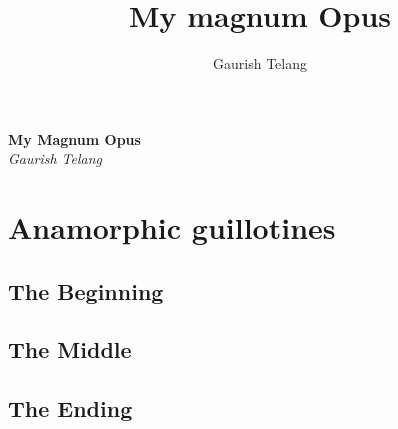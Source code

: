 
\usepackage{mdframed}
\usepackage{xcolor}
\pagestyle{headings}
\usepackage{soul}
\newcommand{\red}[1]{{\color{red} #1}}
\newcommand{\blue}[1]{{\color{blue} #1}}
\newcommand{\green}[1]{{\color{OliveGreen} #1}}
\title{My magnum Opus}
\author{Gaurish Telang}
\date{}

\setcounter{tocdepth}{0}

\begin{titlepage}
   \begin{center}
     \Huge{\textbf{ My Magnum Opus }}\\
     \vspace{5mm}
      \large\textsl{Gaurish Telang}
   \end{center}
\end{titlepage}

\chapter{Anamorphic guillotines}

\blindtext

\section{The Beginning} \hspace{2mm}

\blindtext
\blindtext

\blindtext

\section{The Middle} \hspace{2mm}


\blindtext

\blindtext
\blindtext

\section{The Ending} \hspace{2mm}

\blindtext

\lipsum[1-5]

